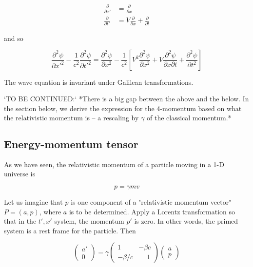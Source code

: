 \begin{align}
  \frac{\partial}{\partial x'} &=  \frac{\partial}{\partial x} \\
  \frac{\partial}{\partial t'} &= V \frac{\partial}{\partial x}
  + \frac{\partial}{\partial t} 
\end{align}

and so

\begin{equation}
\frac{\partial^2 \psi}{\partial x'^2}  
-
\frac{1}{c^2} 
\frac{\partial^2 \psi}{\partial t'^2}
= 
\frac{\partial^2 \psi}{\partial x^2}  
-
\frac{1}{c^2} \left[
V^2 \frac{\partial^2 \psi}{\partial x^2}  +  V \frac{\partial^2 \psi}{\partial x \partial t}  +  \frac{\partial^2 \psi}{\partial t^2}
\right]
\end{equation}

The wave equation is  invariant under Galilean 
transformations.


`TO BE CONTINUED:` *There is a big gap between the above and the below. In the section below, we derive the expression for the 4-momentum based on what the relativistic momentum is -- a rescaling by $\gamma$ of the classical momentum.*

\subsection{Energy-momentum tensor}





As we have seen, the relativistic momentum of a particle
moving in a 1-D universe is 

\begin{equation}
  p = \gamma mv
\end{equation}

Let us imagine that $p$ is one component of a "relativistic
momentum vector" $P = (a, p)$, where $a$ is to be determined.
Apply a Lorentz transformation so that in the $t', x'$ system,  the momentum $p'$ is zero.  In other words, the primed system is a rest frame for the particle.  Then



\begin{equation}
\begin{pmatrix} a' \\ 0 \end{pmatrix}
=
\gamma \begin{pmatrix} 
    1  & - \beta c  \\
  -\beta/c & \phantom{-}1
\end{pmatrix}
\begin{pmatrix} a \\ p \end{pmatrix}
\end{equation}


